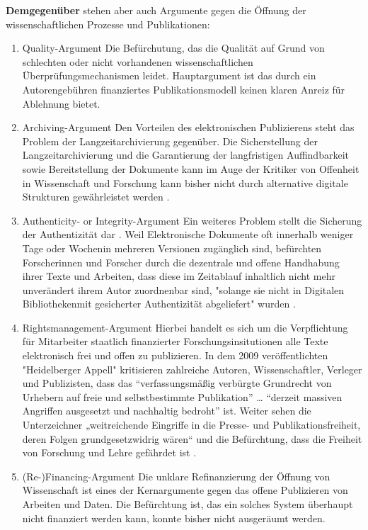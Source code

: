 \textbf{Demgegenüber} stehen aber auch Argumente gegen die Öffnung der wissenschaftlichen Prozesse und Publikationen:
\begin{enumerate}
\item 	Quality-Argument
Die Befürchutung, das die Qualität auf Grund von schlechten oder nicht vorhandenen wissenschaftlichen Überprüfungsmechanismen leidet. Hauptargument ist das durch ein Autorengebühren finanziertes Publikationsmodell keinen klaren Anreiz für Ablehnung bietet.
\item Archiving-Argument
Den Vorteilen des elektronischen Publizierens steht das Problem der Langzeitarchivierung gegenüber. Die Sicherstellung der Langzeitarchivierung und die Garantierung der langfristigen Auffindbarkeit sowie Bereitstellung der Dokumente kann im Auge der Kritiker von Offenheit in Wissenschaft und Forschung kann bisher nicht durch alternative digitale Strukturen gewährleistet werden \cite{umstatter_2007_qualitatssicherung}. 
\item Authenticity- or Integrity-Argument
Ein weiteres Problem stellt die Sicherung der Authentizität dar \cite{umstatter_2007_qualitatssicherung}. Weil Elektronische Dokumente oft innerhalb weniger Tage oder Wochenin mehreren Versionen zugänglich sind, befürchten Forscherinnen und Forscher durch die dezentrale und offene Handhabung ihrer Texte und Arbeiten, dass diese im Zeitablauf inhaltlich nicht mehr unverändert ihrem Autor zuordnenbar sind, "solange sie nicht in Digitalen Bibliothekenmit gesicherter Authentizität abgeliefert" wurden \cite{umstatter_2007_qualitatssicherung}.
\item Rightsmanagement-Argument
Hierbei handelt es sich um die Verpflichtung für Mitarbeiter staatlich finanzierter Forschungsinsitutionen alle Texte elektronisch frei und offen zu publizieren. In dem 2009 veröffentlichten "Heidelberger Appell" \cite{faz_heidelberger_apell_2009} kritisieren zahlreiche Autoren, Wissenschaftler, Verleger und Publizisten, dass das “verfassungsmäßig verbürgte Grundrecht von Urhebern auf freie und selbstbestimmte Publikation” … “derzeit massiven Angriffen ausgesetzt und nachhaltig bedroht” ist. Weiter sehen die Unterzeichner „weitreichende Eingriffe in die Presse- und Publikationsfreiheit, deren Folgen grundgesetzwidrig wären“ \cite{ITK_2009} und die Befürchtung, dass die Freiheit von Forschung und Lehre gefährdet ist \cite{Jochum_2009}. 
\item (Re-)Financing-Argument
Die unklare Refinanzierung der Öffnung von Wissenschaft ist eines der Kernargumente gegen das offene Publizieren von Arbeiten und Daten. Die Befürchtung ist, das ein solches System überhaupt nicht finanziert werden kann, konnte bisher nicht ausgeräumt werden.

\end{enumerate}
